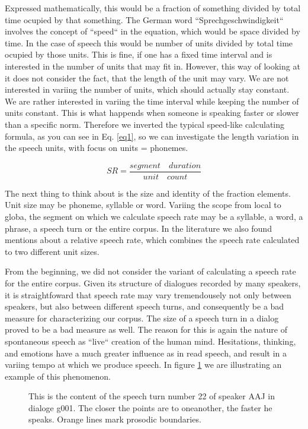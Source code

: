 \documentclass[a4paper]{scrreprt}
\begin{document}
Expressed mathematically, this would be a fraction of something divided by total time ocupied by that something. The German word ``Sprechgeschwindigkeit`` involves the concept of ``speed`` in the equation, which would be space divided by time. In the case of speech this would be number of units divided by total time ocupied by those units. This is fine, if one has a fixed time interval and is interested in the number of units that may fit in. However, this way of looking at it does not consider the fact, that the length of the unit may vary. We are not interested in variing the number of units, which should actually stay constant. We are rather interested in variing the time interval while keeping the number of units constant. This is what happends when someone is speaking faster or slower than a specific norm. Therefore we inverted the typical speed-like calculating formula, as you can see in Eq. \ref{eq1}, so we can investigate the length variation in the speech units, with focus on units = phonemes.

\begin{equation}
\label{eq1}
	SR = \frac{segment \quad duration}{unit\quad count}
\end{equation}

The next thing to think about is the size and identity of the fraction elements. Unit size may be phoneme, syllable or word. Variing the scope from local to globa, the segment on which we calculate speech rate may be a syllable, a word, a phrase, a speech turn or the entire corpus. In the literature \cite{Pfitzinger1998} we also found mentions about a relative speech rate, which combines the speech rate calculated to two different unit sizes.

From the beginning, we did not consider the variant of calculating a speech rate for the entire corpus. Given its structure of dialogues recorded by many speakers, it is straightfoward that speech rate may vary tremendousely not only between speakers, but also between different speech turns, and consequently be a bad measure for characterizing our corpus. The size of a speech turn in a dialog proved to be a bad measure as well. The reason for this is again the nature of spontaneous speech as ``live`` creation of the human mind. Hesitations, thinking, and emotions have a much greater influence as in read speech, and result in a variing tempo at which we produce speech. In figure \ref{fig:SR_example} we are illustrating an example of this phenomenon.

\begin{figure}[htbp]
	\centering
	\noindent{}
	\vspace{-25mm}
	\caption[Example of speech rate variation inside a turn]{This is the content of the speech turn number 22 of speaker AAJ in dialoge g001. The closer the points are to oneanother, the faster he speaks. Orange lines mark prosodic boundaries.}
	\label{fig:SR_example}
\end{figure}
\end{document}
